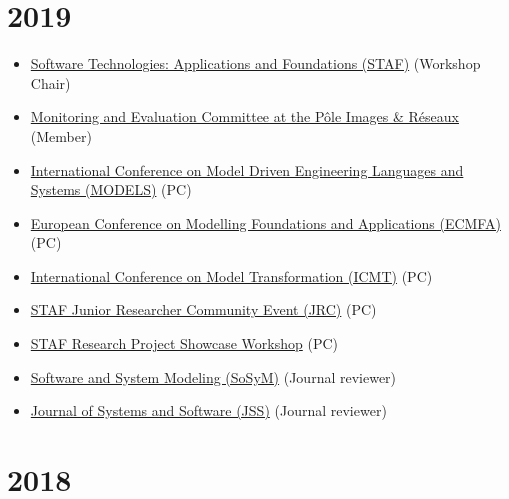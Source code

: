 \hypertarget{section-4}{%
\section{2019}\label{section-4}}

\begin{itemize}
\tightlist
\item
  \href{https://staf2019.win.tue.nl/}{Software Technologies:
  Applications and Foundations (STAF)} (Workshop Chair)
\item
  \href{http://www.images-et-reseaux.com/en}{Monitoring and Evaluation
  Committee at the Pôle Images \& Réseaux} (Member)
\item
  \href{https://modelsconf19.org/}{International Conference on Model
  Driven Engineering Languages and Systems (MODELS)} (PC)
\item
  \href{https://staf2019.win.tue.nl/events/ecmfa19/}{European Conference
  on Modelling Foundations and Applications (ECMFA)} (PC)
\item
  \href{http://www.model-transformation.org/}{International Conference
  on Model Transformation (ICMT)} (PC)
\item
  \href{https://staf2019.win.tue.nl/events/staf-jrc19/}{STAF Junior
  Researcher Community Event (JRC)} (PC)
\item
  \href{https://staf2019.win.tue.nl/events/staf-rps19/}{STAF Research
  Project Showcase Workshop} (PC)
\item
  \href{http://www.sosym.org/}{Software and System Modeling (SoSyM)}
  (Journal reviewer)
\item
  \href{http://www.journals.elsevier.com/journal-of-systems-and-software}{Journal
  of Systems and Software (JSS)} (Journal reviewer)
\end{itemize}

\hypertarget{section-5}{%
\section{2018}\label{section-5}}

